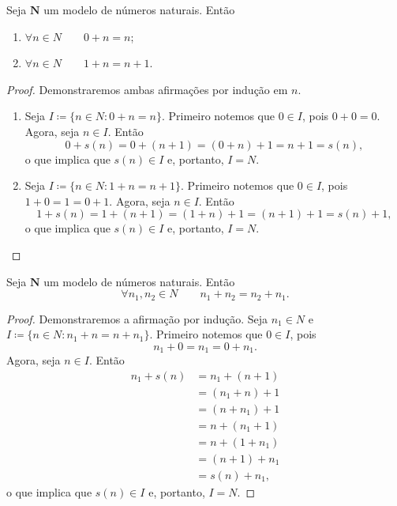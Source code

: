 \begin{lema} \label{conj.nat.lem.adi}
	Seja $\bm N$ um modelo de números naturais. Então
	\begin{enumerate}
	\item $\forall n \in N \qquad 0+n=n$;
	\item $\forall n \in N \qquad 1+n=n+1$.
	\end{enumerate}
\end{lema}
\begin{proof}
	Demonstraremos ambas afirmações por indução em $n$.
	\begin{enumerate}
	\item Seja $I \coloneqq \{n \in N:0+n=n\}$. Primeiro notemos que $0 \in I$, pois $0+0=0$. Agora, seja $n \in I$. Então
	\begin{equation*}
	0+s(n)=0+(n+1)=(0+n)+1=n+1=s(n),
	\end{equation*}
o que implica que $s(n) \in I$ e, portanto, $I=N$.

	\item Seja $I \coloneqq \{n \in N:1+n=n+1\}$. Primeiro notemos que $0 \in I$, pois $1+0=1=0+1$. Agora, seja $n \in I$. Então
	\begin{equation*}
	1+s(n)=1+(n+1)=(1+n)+1=(n+1)+1=s(n)+1,
	\end{equation*}
o que implica que $s(n) \in I$ e, portanto, $I=N$.
	\end{enumerate}
\end{proof}

\begin{teo}
	Seja $\bm N$ um modelo de números naturais. Então
	\begin{equation*}
	\forall n_1,n_2 \in N \qquad n_1+n_2 = n_2+n_1.
	\end{equation*}
\end{teo}
\begin{proof}
 	Demonstraremos a afirmação por indução. Seja $n_1 \in N$ e $I \coloneqq \{n \in N:n_1+n=n+n_1\}$. Primeiro notemos que $0 \in I$, pois
 	\begin{equation*}
 	n_1+0=n_1=0+n_1.
 	\end{equation*}
Agora, seja $n \in I$. Então
 	\begin{align*}
 	n_1+s(n) &= n_1+(n+1) \\
 		&= (n_1+n)+1 \\
 		&= (n+n_1)+1 \\
 		&= n+(n_1+1) \\
 		&= n+(1+n_1) \\
 		&= (n+1)+n_1 \\
 		&= s(n)+n_1,
 	\end{align*}
 o que implica que $s(n) \in I$ e, portanto, $I=N$.
\end{proof}

